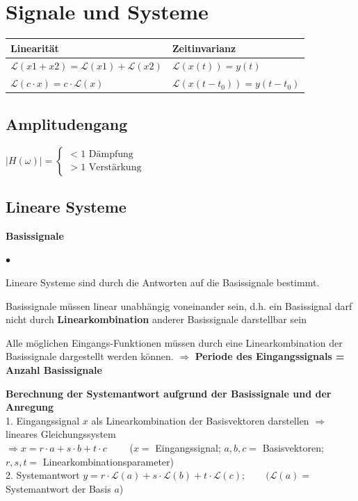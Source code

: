 \section{Signale und Systeme}

	\begin{tabular}{|l|l|}
    	\hline
    	\textbf{Linearität} & \textbf{Zeitinvarianz}\\
    	\hline
    	$\mathcal{L}(x1+x2)=\mathcal{L}(x1)+\mathcal{L}(x2)$ & $\mathcal{L}(x(t)) = y(t)$ \\
    	$\mathcal{L}(c\cdot x)=c\cdot \mathcal{L}(x)$ & $\mathcal{L}(x(t-t_0)) = y(t-t_0)$ \\
		\hline    
    \end{tabular}
  	
	\subsection{Amplitudengang}
		$|H(\omega)| = \begin{cases}
			< 1 \text{ Dämpfung} \\
			> 1 \text{ Verstärkung}
		\end{cases}$
		
		
	\subsection{Lineare Systeme}
		\textbf{Basissignale}
		\begin{list}{$\bullet$}{\setlength{\itemsep}{0cm} \setlength{\parsep}{0cm} \setlength{\topsep}{0cm}} 
          \item Lineare Systeme sind durch die Antworten auf die
          Basissignale bestimmt.
          \item Basissignale müssen linear unabhängig voneinander sein, d.h. ein
		Basissignal darf nicht durch \textbf{Linearkombination} anderer Basissignale
		darstellbar sein          
		  \item Alle möglichen Eingangs-Funktionen müssen durch eine Linearkombination der
		Basissignale dargestellt werden können. $\Rightarrow$ \textbf{Periode des Eingangssignals =	Anzahl Basissignale}
        \end{list}
        \vspace{.2cm}
		\textbf{Berechnung der Systemantwort aufgrund der Basissignale und der
		Anregung}\\
		1. Eingangssignal $x$ als Linearkombination der Basisvektoren darstellen
		$\Rightarrow$ lineares Gleichungssystem\\
		$\Rightarrow x=r\cdot a + s\cdot b + t\cdot c\qquad$ ($x=$
		Eingangssignal; $a,b,c=$ Basisvektoren; $r,s,t=$
		Linearkombinationsparameter)\\ 
		2. Systemantwort $y=r\cdot \mathcal{L}(a) + s\cdot \mathcal{L}(b) + t\cdot \mathcal{L}(c); \qquad (\mathcal{L}(a)=$
		Systemantwort der Basis $a$)
	
